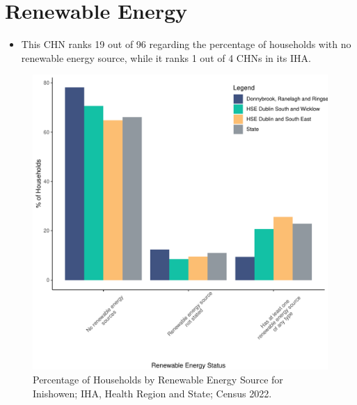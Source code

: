 \documentclass{article}
\begin{document}
\section{Renewable Energy}\label{sect:RE}
\begin{itemize}
\item This CHN ranks  19 out of 96 regarding the percentage of households with no renewable energy source, while it ranks   1 out of 4 CHNs in its IHA.
\end{itemize}
\begin{figure}[H]
	\centering
	\includegraphics[width = 140mm]{../figures/RenewableEnergyED.pdf}
	\caption{Percentage of Households by Renewable Energy Source for Inishowen; IHA, Health Region and State; Census 2022.}
	\label{fig:vbnv}
	\end{figure}
\end{document}
